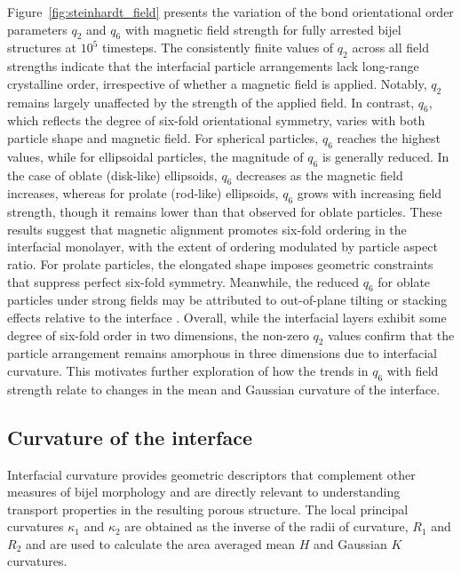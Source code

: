 Figure~\ref{fig:steinhardt_field} presents the variation of the bond orientational order parameters \(q_2\) and \(q_6\) with magnetic field strength for fully arrested bijel structures at \(10^5\) 
timesteps. The consistently finite values of \(q_2\) across all field strengths indicate that the interfacial particle arrangements lack long-range crystalline order, irrespective of whether a magnetic 
field is applied. Notably, \(q_2\) remains largely unaffected by the strength of the applied field. In contrast, \(q_6\), which reflects the degree of six-fold orientational symmetry, varies with both 
particle shape and magnetic field. For spherical particles, \(q_6\) reaches the highest values, while for ellipsoidal particles, the magnitude of \(q_6\) is generally reduced. In the case of oblate 
(disk-like) ellipsoids, \(q_6\) decreases as the magnetic field increases, whereas for prolate (rod-like) ellipsoids, \(q_6\) grows with increasing field strength, though it remains lower than that 
observed for oblate particles. These results suggest that magnetic alignment promotes six-fold ordering in the interfacial monolayer, with the extent of ordering modulated by particle aspect ratio. 
For prolate particles, the elongated shape imposes geometric constraints that suppress perfect six-fold symmetry. Meanwhile, the reduced \(q_6\) for oblate particles under strong fields may be attributed 
to out-of-plane tilting or stacking effects relative to the interface \cite{dabat_mesoscale_2018}. Overall, while the interfacial layers exhibit some degree of six-fold order in two dimensions, the 
non-zero \(q_2\) values confirm that the particle arrangement remains amorphous in three dimensions due to interfacial curvature. This motivates further exploration of how the trends in \(q_6\) with 
field strength relate to changes in the mean and Gaussian curvature of the interface.

\subsection{Curvature of the interface}

Interfacial curvature provides geometric descriptors that complement other measures of bijel morphology and are directly relevant to understanding transport properties in the resulting porous structure.
\cite{reeves_quantitative_2016} The local principal curvatures \(\kappa_1\) and \(\kappa_2\) are obtained as the inverse of the radii of curvature, \(R_1\) and \(R_2\) and are used to calculate
the area averaged mean $H$ and Gaussian $K$ curvatures.

